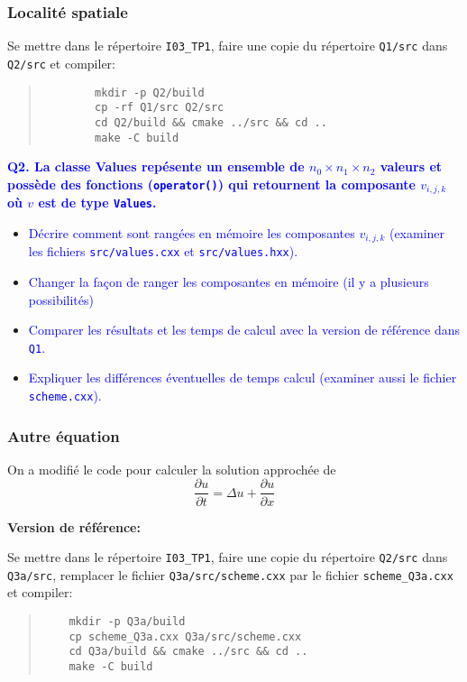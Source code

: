 \documentclass{beamer}
\begin{document}
\begin{frame}[fragile]
\frametitle{Localit\'e spatiale}
\vfill
    	
	Se mettre dans le r\'epertoire {\tt I03\_TP1}, faire une copie du r\'epertoire {\tt Q1/src} dans {\tt Q2/src} et compiler:
	
	\begin{quote}
		\begin{verbatim}
		mkdir -p Q2/build
		cp -rf Q1/src Q2/src
		cd Q2/build && cmake ../src && cd ..
		make -C build
		\end{verbatim}
	\end{quote}

\end{frame}

\begin{frame}[fragile]
	\vfill
	\textcolor{blue}{\bf Q2. La classe {Values} rep\'esente un ensemble de $n_0 \times n_1 \times n_2$ valeurs et poss\`ede des fonctions ({\tt operator()}) qui retournent la composante $v_{i,j,k}$ o\`u $v$ est de type {\tt Values}.}
	
	\vfill
	\begin{itemize}
		\item \textcolor{blue}{D\'ecrire comment sont rang\'ees en m\'emoire les composantes $v_{i,j,k}$
		(examiner les fichiers {\tt src/values.cxx} et {\tt src/values.hxx}).}
	\vfill
		\item \textcolor{blue}{Changer la fa\c{c}on de ranger les composantes en m\'emoire (il y a plusieurs possibilit\'es)}
	\vfill
		\item \textcolor{blue}{Comparer les r\'esultats et les temps de calcul avec la version de r\'ef\'erence dans {\tt Q1}.}
	\vfill
		\item \textcolor{blue}{Expliquer les diff\'erences \'eventuelles de temps calcul (examiner aussi le fichier {\tt scheme.cxx}).}
	\end{itemize}
	\vfill
	 
\end{frame}

\begin{frame}
	\frametitle{Autre \'equation}
	
	On a modifi\'e le code pour calculer la solution approch\'ee de 
	$$
	\frac{\partial u}{\partial t} = \Delta u + \frac{\partial u}{\partial x}
	$$
	
\vfill
\end{frame}

\begin{frame}[fragile]

{\bf Version de r\'ef\'erence:}
\vfill

Se mettre dans le r\'epertoire {\tt I03\_TP1}, faire une copie du r\'epertoire {\tt Q2/src} dans {\tt Q3a/src}, remplacer le fichier {\tt Q3a/src/scheme.cxx} par le fichier {\tt scheme\_Q3a.cxx} et compiler:
\begin{quote}
	\begin{verbatim}
	mkdir -p Q3a/build
	cp scheme_Q3a.cxx Q3a/src/scheme.cxx
	cd Q3a/build && cmake ../src && cd ..
	make -C build
	\end{verbatim}
\end{quote}
\end{frame}
\end{document}
